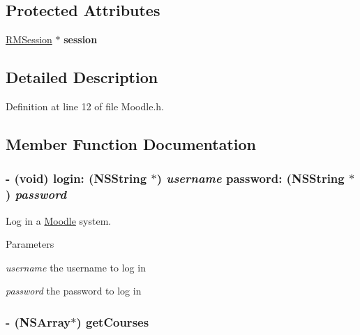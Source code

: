 \subsection*{Protected Attributes}
\begin{DoxyCompactItemize}
\item 
\hypertarget{interface_moodle_aff717c5349de2476696eef1117b2e4e1}{
\hyperlink{interface_r_m_session}{RMSession} $\ast$ {\bfseries session}}
\label{interface_moodle_aff717c5349de2476696eef1117b2e4e1}

\end{DoxyCompactItemize}


\subsection{Detailed Description}


Definition at line 12 of file Moodle.h.

\subsection{Member Function Documentation}
\hypertarget{interface_moodle_a9213ffaec574e053426c7889c096ab3d}{
\subsubsection[{login:password:}]{\setlength{\rightskip}{0pt plus 5cm}-\/ (void) login: (NSString $\ast$) {\em username}\/ password: (NSString $\ast$) {\em password}}}
\label{interface_moodle_a9213ffaec574e053426c7889c096ab3d}


Log in a \hyperlink{interface_moodle}{Moodle} system. 
\begin{DoxyParams}{Parameters}
\item[{\em username}]the username to log in \item[{\em password}]the password to log in \end{DoxyParams}
\hypertarget{interface_moodle_a04e4a2082a8100dc2f1f6948bd843aa6}{
\subsubsection[{getCourses}]{\setlength{\rightskip}{0pt plus 5cm}-\/ (NSArray$\ast$) getCourses }}
\label{interface_moodle_a04e4a2082a8100dc2f1f6948bd843aa6}


